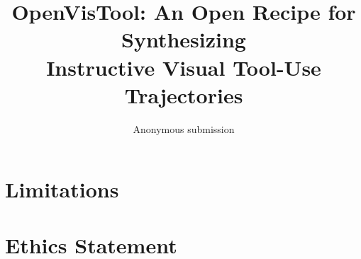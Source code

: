 \documentclass[letterpaper]{article} %
\title{OpenVisTool: An Open Recipe for Synthesizing \\ Instructive Visual Tool-Use Trajectories}
\author{Anonymous submission}
\begin{document}
\maketitle







\section*{Limitations}

\section*{Ethics Statement}



\appendix

\end{document}
